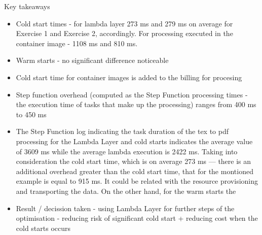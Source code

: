 \datasetLayerVsImage


Key takeaways

\begin{itemize}
    \item Cold start times - for lambda layer 273 ms and 279 ms on average for Exercise 1 and Exercise 2, accordingly. For processing executed in the container image - 1108 ms and 810 ms.
    \item Warm starts - no significant difference noticeable
    \item Cold start time for container images is added to the billing for procesing
    \item Step function overhead (computed as the Step Function processing times - the execution time of tasks that make up the processing) ranges from 400 ms to 450 ms
    \item The Step Function log indicating the task duration of the tex to pdf processing for the Lambda Layer and cold starts indicates the average value of 3609 ms while the average lambda execution is 2422 ms. Taking into consideration the cold start time, which is on average 273 ms --- there is an additional overhead greater than the cold start time, that for the montioned example is equal to 915 ms. It could be related with the resource provisioning and transporting the data. On the other hand, for the warm starts the 
    \item Result / decission taken - using Lambda Layer for further steps of the optimisation - reducing risk of significant cold start + reducing cost when the cold starts occurs
\end{itemize}

